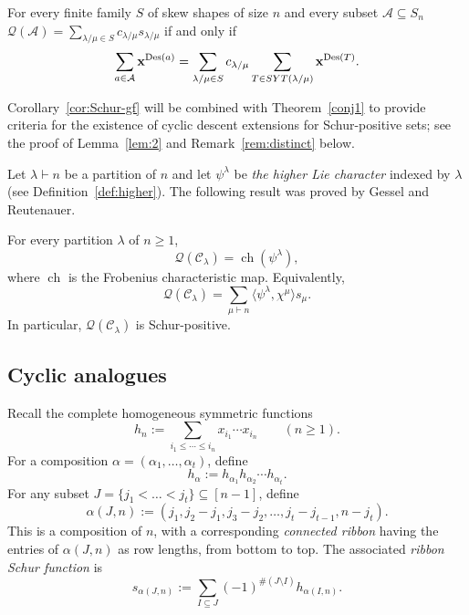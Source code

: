 \documentclass[ALCO,published]{cedram}
\newcommand{\Q}{\mathcal Q}
\newcommand{\C}{\mathcal C}
\newcommand{\A}{\mathcal A}
\DeclareMathOperator\Des{Des}
\newcommand\comp[2]{\alpha{(#2,#1)}}
\newcommand{\ch}{{\operatorname{ch}}}
\def\SYT{{\rm SYT}}
\begin{document}
\begin{corollary}\label{cor:Schur-gf}
    For every finite family $S$ of skew shapes of size $n$  and every subset $\A\subseteq S_n$ 
    $\Q(\A)= \sum\limits_{\lambda/\mu\in S} c_{\lambda/\mu} s_{\lambda/\mu}$ 
    if and only if 
    \[
        \sum\limits_{a\in \A} {\bf x}^{\Des(a)}=\sum\limits_{\lambda/\mu\in S} c_{\lambda/\mu} 
        \sum\limits_{T\in \SYT(\lambda/\mu)}{\bf x}^{\Des(T)}. 
    \]
\end{corollary}

Corollary~\ref{cor:Schur-gf} will be combined with Theorem~\ref{conj1} to provide criteria for the existence of cyclic descent extensions for Schur-positive sets; see the proof of Lemma~\ref{lem:2} and Remark~\ref{rem:distinct} below.  

Let $\lambda \vdash n$ be a partition of $n$ and let $\psi^\lambda$ be {\em the higher Lie character} indexed by $\lambda$ (see Definition~\ref{def:higher}).
The following result was proved by Gessel and Reutenauer. 

\begin{theorem}\label{thm:GR22}
	For every partition $\lambda$ of $n\ge 1$, 
	\[
		\Q(\C_\lambda) = \ch(\psi^\lambda),
	\]
	where $\ch$ is the Frobenius characteristic map.
    Equivalently,		
	\[
		\Q(\C_\lambda)=
		\sum\limits_{\mu \vdash n} 
		\langle \psi^\lambda, \chi^\mu  \rangle s_\mu.
	\]
	In particular, $\Q(\C_\lambda)$ is Schur-positive.
\end{theorem}


\subsection{Cyclic analogues}
\label{sec:prel2}
		
Recall the complete homogeneous symmetric functions
\[
    h_n := 
    \sum_{i_1\le \cdots\le i_n} x_{i_1} \cdots x_{i_n}
    \qquad (n \ge 1).
\]
For a composition $\alpha =(\alpha_1,\ldots,\alpha_t)$, define
\[
    h_\alpha :=
    h_{\alpha_1}h_{\alpha_2} \cdots h_{\alpha_t}. 
\]
For any subset $J=\{j_1  < \ldots < j_t\} \subseteq [n-1]$, define
\[
    \comp{n}{J} := 
    (j_1,j_2-j_1,j_3-j_2,\ldots,j_t-j_{t-1},n-j_t).
\]
This is a composition of $n$, with a corresponding {\em connected ribbon} having the entries of $\alpha(J,n)$ as row lengths, from bottom to top. 
The associated {\em ribbon Schur function} is
\[
    s_{\alpha(J,n)} :=
    \sum_{I \subseteq J} (-1)^{\#(J \setminus I)} h_{\comp{n}{I}}. 
\]
\end{document}
